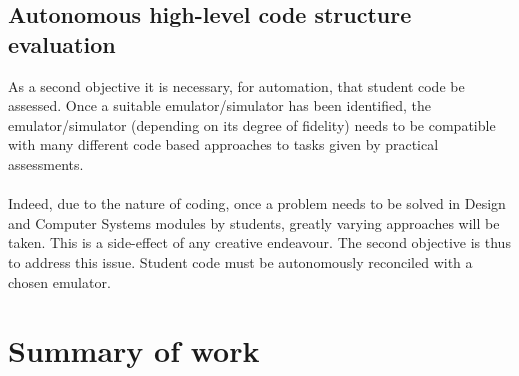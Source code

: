 \subsection{Autonomous high-level code structure evaluation}
\label{highLevObj}
As a second objective it is necessary, for automation, that student code be assessed. Once a suitable emulator/simulator has been identified, the emulator/simulator (depending on its degree of fidelity) needs to be compatible with many different code based approaches to tasks given by practical assessments.
\\\\
Indeed, due to the nature of coding, once a problem needs to be solved in Design and Computer Systems modules by students, greatly varying approaches will be taken. This is a side-effect of any creative endeavour. The second objective is thus to address this issue. Student code must be autonomously reconciled with a chosen emulator.

\section{Summary of work}
\label{sow}


